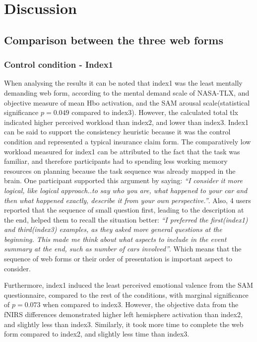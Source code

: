 \documentclass[a4paper]{report}
\begin{document}
\chapter{Discussion}
	\section{Comparison between the three web forms}
		\subsection{Control condition - Index1}
			When analysing the results it can be noted that index1 was the least mentally demanding web form, according to the mental demand scale of NASA-TLX, and objective measure of mean Hbo activation, and the SAM arousal scale(statistical significance $p=0.049$ compared to index3). However, the calculated total tlx indicated higher perceived workload than index2, and lower than index3. Index1 can be said to support the consistency heuristic\cite{nielsen1990heuristic} because it was the control condition and represented a typical insurance claim form. The comparatively low workload measured for index1 can be attributed to the fact that the task was familiar, and therefore participants had to spending less working memory resources on planning because the task sequence was already mapped in the brain. One participant supported this argument by saying: \textit{``I consider it more logical, like logical approach..to say who you are, what happened to your car and then what happened exactly, describe it from your own perspective.''}. Also, 4 users reported that the sequence of small question first, leading to the description at the end, helped them to recall the situation better: \textit{``I preferred the first(index1) and third(index3) examples, as they asked more general questions at the beginning. This made me think about what aspects to include in the event summary at the end, such as number of cars involved''}. Which means that the sequence of web forms or their order of presentation is important aspect to consider.
		
			Furthermore, index1 induced the least perceived emotional valence from the SAM questionnaire, compared to the rest of the conditions, with marginal significance of $p=0.073$ when compared to index3. However, the objective data from the fNIRS differences demonstrated higher left hemisphere activation than index2, and slightly less than index3. Similarly, it took more time to complete the web form compared to index2, and slightly less time than index3.	
	
\end{document}
